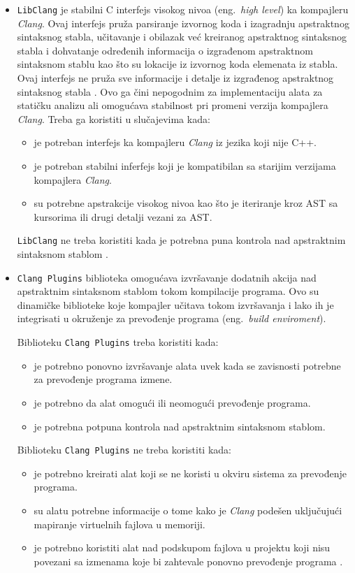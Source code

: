 \documentclass[12pt,oneside]{memoir}
\begin{document}
\begin{itemize}
\item \texttt{LibClang} je stabilni C interfejs visokog nivoa  (eng.~\textit{high level}) ka kompajleru \textit{Clang}. Ovaj interfejs pru\v{z}a parsiranje izvornog koda
i izagradnju apstraktnog sintaksnog stabla, u\v{c}itavanje i obilazak ve\'{c} kreiranog apstraktnog sintaksnog stabla i dohvatanje određenih informacija o izgrađenom apstraktnom sintaksnom stablu kao \v{s}to su lokacije iz izvornog koda elemenata iz stabla. Ovaj interfejs ne pru\v{z}a sve informacije i detalje iz izgrađenog apstraktnog sintaksnog stabla \cite{LibClang}. Ovo ga \v{c}ini nepogodnim za implementaciju alata za stati\v{c}ku analizu ali omogu\'{c}ava stabilnost pri promeni verzija kompajlera \textit{Clang}.
Treba ga koristiti u slu\v{c}ajevima kada:
\begin{itemize}
  \item je potreban interfejs ka kompajleru \textit{Clang} iz jezika koji nije C++.
  \item je potreban stabilni inferfejs koji je kompatibilan sa starijim verzijama kompajlera \textit{Clang}.
  \item su potrebne apstrakcije visokog nivoa kao \v{s}to je iteriranje kroz AST sa kursorima ili drugi detalji vezani za AST.
\end{itemize}
\texttt{LibClang} ne treba koristiti kada je potrebna puna kontrola nad apstraktnim sintaksnom stablom \cite{RightInterface}.

\item \texttt{Clang Plugins} biblioteka omogu\'{c}ava izvr\v{s}avanje dodatnih akcija nad apstraktnim sintaksnom stablom tokom kompilacije programa. Ovo su dinami\v{c}ke biblioteke koje kompajler u\v{c}itava tokom izvr\v{s}avanja i lako ih je integrisati u okru\v{z}enje za prevođenje programa (eng.~\textit{build enviroment}).

Biblioteku \texttt{Clang Plugins} treba koristiti kada:

\begin{itemize}
\item je potrebno ponovno izvr\v{s}avanje alata uvek kada se zavisnosti potrebne za prevođenje programa izmene.
\item je potrebno da alat omogu\'{c}i ili neomogu\'{c}i prevođenje programa.
\item je potrebna potpuna kontrola nad apstraktnim sintaksnom stablom.
\end{itemize}
Biblioteku \texttt{Clang Plugins} ne treba koristiti kada:
\begin{itemize}
\item je potrebno kreirati alat koji se ne koristi u okviru sistema za prevođenje programa.
\item su alatu potrebne informacije o tome kako je \textit{Clang} pode\v{s}en uklju\v{c}uju\'{c}i mapiranje virtuelnih fajlova u memoriji.
\item je potrebno koristiti alat nad podskupom fajlova u projektu koji nisu povezani sa izmenama koje bi zahtevale ponovno prevođenje programa \cite{RightInterface}.
\end{itemize}


\end{itemize}
\end{document}
